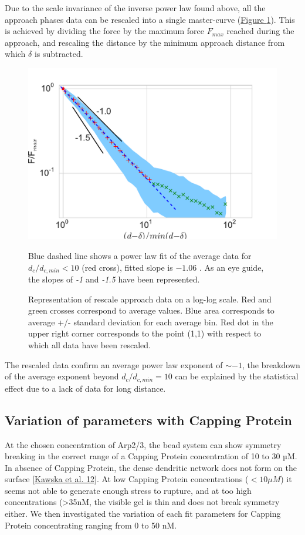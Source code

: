 \documentclass[A4paperpaper,11pt,english]{sphinxmanual}
\begin{document}
Due to the scale invariance of the inverse power law found above,  all the
approach phases data can be rescaled into a single master-curve (\hyperref[parts/part3:fig-rescale-powerlaw]{Figure  \ref*{parts/part3:fig-rescale-powerlaw}}). This is achieved
by dividing the force by the maximum force \(F_{max}\) reached during the
approach, and rescaling the distance by the minimum approach distance from which
\(\delta\) is subtracted.
\begin{figure}[htbp]
\centering
\capstart

\includegraphics[width=0.700\linewidth]{rescaled_powerlaw.pdf}
\caption{Representation of rescale approach data on a log-log scale.  Red and green
crosses correspond to average values. Blue area corresponds to average +/-
standard deviation for each average bin. Red dot in the upper right corner
corresponds to the point (1,1) with respect to which all data have been
rescaled.}{\small 
Blue dashed line shows a power law fit of the average data for
\(d_c/d_{c,min} < 10\) (red cross), fitted slope is \(-1.06\) .
As an eye guide, the slopes of \emph{-1} and \emph{-1.5} have been represented.
}\label{parts/part3:fig-rescale-powerlaw}\end{figure}

The rescaled data confirm an average power law exponent of \(\sim -1\), the
breakdown of the average exponent beyond \(d_c/d_{c,min}=10\) can be
explained by the statistical effect due to a lack of data for long distance.


\subsection{Variation of parameters with Capping Protein}
\label{parts/part3:variation-of-parameters-with-capping-protein}
At the chosen concentration of Arp2/3, the bead system can show symmetry
breaking in the correct range of a Capping Protein concentration of 10 to 30
µM. In absence of Capping Protein, the dense dendritic network does not form on
the surface {\hyperref[parts/part3:kawska2012]{{[}Kawska et al. 12{]}}}. At low Capping Protein concentrations (\(<10 \mu{}M\)) it seems not able to generate enough stress to
rupture, and at too high concentrations (\textgreater{}35nM, the visible gel is thin and does
not break symmetry either. We then investigated the variation of each fit parameters for Capping Protein concentrating ranging from 0 to 50 nM.
\end{document}

